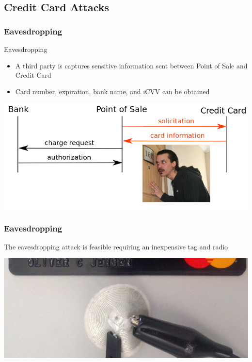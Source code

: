 \documentclass[unknownkeysallowed]{beamer}
\begin{document}
\subsection{Credit Card Attacks}
\begin{frame}
\frametitle{Eavesdropping}\centering
     \begin{minipage}{.7\textwidth}
              \begin{block}{Eavesdropping}
                \begin{itemize}
                  \item{A third party is captures sensitive information sent between Point of Sale and Credit Card}
                  \item<2->{Card number, expiration, bank name, and iCVV can be obtained}
                \end{itemize}
              \end{block}
              \begin{center}
                \includegraphics[width=.7\linewidth,height=\textheight,keepaspectratio]{figures/CCeaves.png}
              \end{center}
     \end{minipage}
\end{frame}

\begin{frame}
\frametitle{Eavesdropping}\centering
     \begin{minipage}{.7\textwidth}
          The eavesdropping attack is feasible requiring an inexpensive tag and radio
              \begin{center}
                \includegraphics[width=.7\linewidth,height=\textheight,keepaspectratio]{../TomPaper/figures/eavesdroppingAntenna.png}
              \end{center}
     \end{minipage}
\end{frame}
\end{document}
